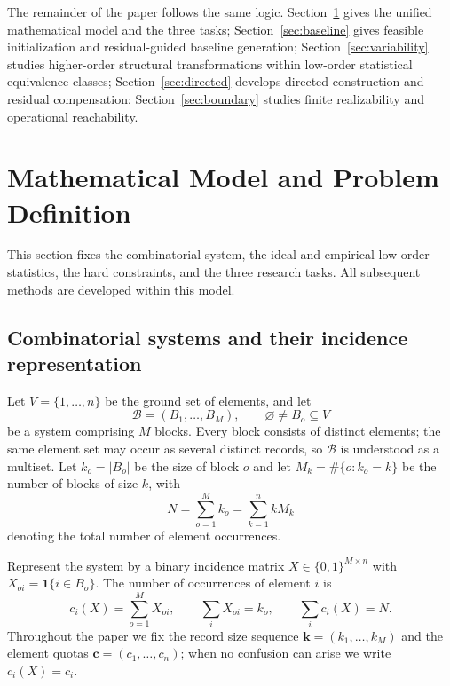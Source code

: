 \documentclass[11pt,a4paper]{article}
\numberwithin{equation}{section}
\theoremstyle{definition}
\numberwithin{algorithm}{section}
\begin{document}
The remainder of the paper follows the same logic.
Section~\ref{sec:model} gives the unified mathematical model and the three tasks;
Section~\ref{sec:baseline} gives feasible initialization and residual-guided baseline generation;
Section~\ref{sec:variability} studies higher-order structural transformations within
low-order statistical equivalence classes;
Section~\ref{sec:directed} develops directed construction and residual compensation;
Section~\ref{sec:boundary} studies finite realizability and operational reachability.

\section{Mathematical Model and Problem Definition}\label{sec:model}

This section fixes the combinatorial system, the ideal and empirical low-order statistics,
the hard constraints, and the three research tasks.
All subsequent methods are developed within this model.

\subsection{Combinatorial systems and their incidence representation}\label{subsec:model-incidence}

Let $V=\{1,\ldots,n\}$ be the ground set of elements, and let
\begin{equation}
\mathcal B=(B_1,\ldots,B_M),\qquad \varnothing\neq B_o\subseteq V
\label{eq:blocks}
\end{equation}
be a system comprising $M$ blocks.
Every block consists of distinct elements; the same element set may occur as several
distinct records, so $\mathcal B$ is understood as a multiset.
Let $k_o=|B_o|$ be the size of block $o$ and let
$M_k=\#\{o:k_o=k\}$ be the number of blocks of size $k$, with
\begin{equation}
N=\sum_{o=1}^M k_o=\sum_{k=1}^n kM_k
\label{eq:total-incidences}
\end{equation}
denoting the total number of element occurrences.

Represent the system by a binary incidence matrix $X\in\{0,1\}^{M\times n}$ with
$X_{oi}=\mathbf 1\{i\in B_o\}$.
The number of occurrences of element $i$ is
\begin{equation}
c_i(X)=\sum_{o=1}^M X_{oi},\qquad
\sum_i X_{oi}=k_o,\qquad \sum_i c_i(X)=N.
\label{eq:incidence-counts}
\end{equation}
Throughout the paper we fix the record size sequence $\boldsymbol k=(k_1,\ldots,k_M)$
and the element quotas $\boldsymbol c=(c_1,\ldots,c_n)$;
when no confusion can arise we write $c_i(X)=c_i$.
\end{document}

